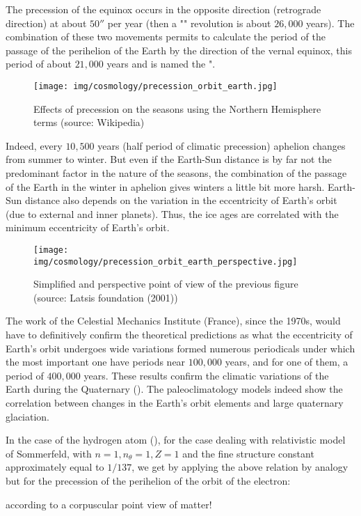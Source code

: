 	The precession of the equinox occurs in the opposite direction (retrograde direction) at about $50''$ per year (then a "" revolution is about $26,000$ years). The combination of these two movements permits to calculate the period of the passage of the perihelion of the Earth by the direction of the vernal equinox, this period of about $21,000$ years and is named the ".
	\begin{figure}[H]
		\centering
		\texttt{[image: img/cosmology/precession\_orbit\_earth.jpg]}	
		\caption[Effects of precession on the seasons using the Northern Hemisphere terms]{Effects of precession on the seasons using the Northern Hemisphere terms (source: Wikipedia)}
	\end{figure}
	Indeed, every $10,500$ years (half period of climatic precession) aphelion changes from summer to winter. But even if the Earth-Sun distance is by far not the predominant factor in the nature of the seasons, the combination of the passage of the Earth in the winter in aphelion gives winters a little bit more harsh. Earth-Sun distance also depends on the variation in the eccentricity of Earth's orbit (due to external and inner planets). Thus, the ice ages are correlated with the minimum eccentricity of Earth's orbit.
	\begin{figure}[H]
		\centering
		\texttt{[image: img/cosmology/precession\_orbit\_earth\_perspective.jpg]}	
		\caption[]{Simplified and perspective point of view of the previous figure (source: Latsis foundation (2001))}
	\end{figure}
	The work of the Celestial Mechanics Institute (France), since the 1970s, would have to definitively confirm the theoretical predictions as what the eccentricity of Earth's orbit undergoes wide variations formed numerous periodicals under which the most important one have periods near $100,000$ years, and for one of them, a period of $400,000$ years. These results confirm the climatic variations of the Earth during the Quaternary (). The paleoclimatology models indeed show the correlation between changes in the Earth's orbit elements and large quaternary glaciation.
	\begin{tcolorbox}[title=Remark,colframe=black,arc=10pt]
	In the case of the hydrogen atom (), for the case dealing with relativistic model of Sommerfeld, with $n=1,n_\theta=1,Z=1$ and the fine structure constant approximately equal to $1/137$, we get by applying the above relation by analogy but for the precession of the perihelion of the orbit of the electron:
	
	according to a corpuscular point view of matter!
	\end{tcolorbox}
	
